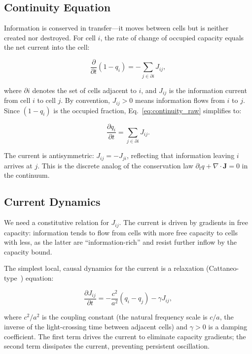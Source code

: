 \documentclass[aps,prd,twocolumn,showpacs,superscriptaddress,preprintnumbers]{revtex4-2}
\begin{document}
\subsection{Continuity Equation}

Information is conserved in transfer---it moves between cells but is neither created nor destroyed.
For cell $i$, the rate of change of occupied capacity equals the net current into the cell:

\begin{equation}
\frac{\partial}{\partial t}(1 - q_i) = -\sum_{j \in \partial i} J_{ij},
\label{eq:continuity_raw}
\end{equation}

where $\partial i$ denotes the set of cells adjacent to $i$, and $J_{ij}$ is the information current from cell $i$ to cell $j$.
By convention, $J_{ij}>0$ means information flows from $i$ to $j$.
Since $(1-q_i)$ is the occupied fraction, Eq.~\eqref{eq:continuity_raw} simplifies to:

\begin{equation}
\boxed{\frac{\partial q_i}{\partial t} = \sum_{j \in \partial i} J_{ij}}.
\label{eq:continuity}
\end{equation}

The current is antisymmetric: $J_{ij}=-J_{ji}$, reflecting that information leaving $i$ arrives at $j$.
This is the discrete analog of the conservation law $\partial_t q + \nabla\cdot\mathbf{J}=0$ in the continuum.

\subsection{Current Dynamics}

We need a constitutive relation for $J_{ij}$.
The current is driven by gradients in free capacity: information tends to flow from cells with more free capacity to cells with less, as the latter are ``information-rich'' and resist further inflow by the capacity bound.

The simplest local, causal dynamics for the current is a relaxation (Cattaneo-type~\cite{Cattaneo:1948,Jou:2010}) equation:

\begin{equation}
\frac{\partial J_{ij}}{\partial t} = -\frac{c^2}{a^2}(q_i - q_j) - \gamma J_{ij},
\label{eq:current_dyn}
\end{equation}

where $c^2/a^2$ is the coupling constant (the natural frequency scale is $c/a$, the inverse of the light-crossing time between adjacent cells) and $\gamma>0$ is a damping coefficient.
The first term drives the current to eliminate capacity gradients; the second term dissipates the current, preventing persistent oscillation.
\end{document}
